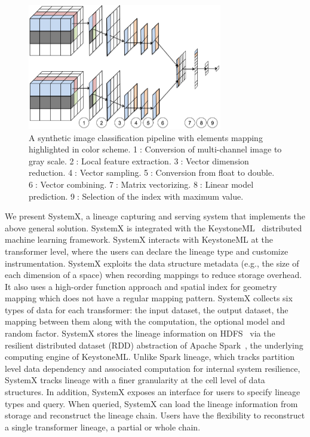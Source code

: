 \documentclass{sig-alternate}
\begin{document}
\begin{figure}[t]
\begin{center}
    \includegraphics[width=85mm]{pictures/Conceptual}
    \caption {A synthetic image classification pipeline with elements mapping highlighted in color scheme. 
    \textcircled{1}: Conversion of multi-channel image to gray scale.
    \textcircled{2}: Local feature extraction.
    \textcircled{3}: Vector dimension reduction.
    \textcircled{4}: Vector sampling.
    \textcircled{5}: Conversion from float to double.
    \textcircled{6}: Vector combining.
    \textcircled{7}: Matrix vectorizing.
    \textcircled{8}: Linear model prediction.
    \textcircled{9}: Selection of the index with maximum value.
    \label{fig:conceptual}
}
\end{center}
\end{figure}


We present SystemX, a lineage capturing and serving system that implements the above general solution.
SystemX is integrated with the KeystoneML~\cite{sparks15} distributed machine learning framework.
SystemX interacts with KeystoneML at the transformer level, where the users can declare the lineage type and customize instrumentation.
SystemX exploits the  data structure metadata (e.g., the size of each dimension of a space) when recording mappings to reduce storage overhead.
It also uses a high-order function approach and spatial index for geometry mapping which does not have a regular mapping pattern.
SystemX collects six types of data for each transformer: the input dataset, the output dataset, the mapping between them
along with the computation, the optional model and random factor.
SystemX stores the lineage information on HDFS~\cite{shvachko10} via the resilient distributed dataset (RDD) abstraction
of Apache Spark~\cite{zaharia12}, the underlying computing engine of KeystoneML.
Unlike Spark lineage, which tracks partition level data dependency and associated computation for internal system resilience,
SystemX tracks lineage with a finer granularity at the cell level of data structures.
In addition, SystemX exposes an interface for users to specify lineage types and query.
When queried, SystemX can load the lineage information from storage and reconstruct the lineage chain.
Users have the flexibility to reconstruct a single transformer lineage, a partial or whole chain.
\end{document}
